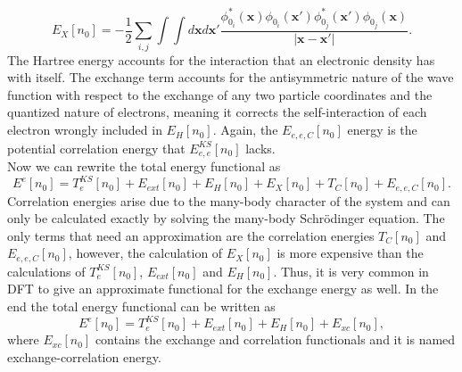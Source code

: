 \begin{equation}
 E_{X}[n_{0}]=-\frac{1}{2}\sum_{i,j}\int{\int{d\mathbf{x}d\mathbf{x}'\frac{\phi_{0_{i}}^{*}(\mathbf{x})\phi_{0_{i}}(\mathbf{x}')\phi_{0_{j}}^{*}(\mathbf{x}')\phi_{0_{j}}(\mathbf{
 x})}{|\mathbf{x}-\mathbf{x}'|}}}.
\end{equation}
The Hartree energy accounts for the interaction that an electronic density has with itself. The exchange term accounts for the antisymmetric nature of the wave function with respect to the exchange of any two particle coordinates 
and the quantized nature of electrons, meaning it corrects the self-interaction of each electron wrongly included in $E_{H}[n_{0}]$. Again, the $E_{e,e,C}[n_{0}]$ energy is the potential correlation energy 
that $E_{e,e}^{KS}[n_{0}]$ lacks. \\

Now we can rewrite the total energy functional as
\begin{equation}
 E^{e}[n_{0}]=T_{e}^{KS}[n_{0}]+E_{ext}[n_{0}]+E_{H}[n_{0}]+E_{X}[n_{0}]+T_{C}[n_{0}]+E_{e,e,C}[n_{0}].
\end{equation}
Correlation energies arise due to the many-body character of the system and can only be calculated exactly by solving the many-body Schr\"odinger equation\cite{ceperley1980ground}. The only terms that need an approximation are the 
correlation energies $T_{C}[n_{0}]$ and \\ $E_{e,e,C}[n_{0}]$, however, the calculation of $E_{X}[n_{0}]$ is more expensive than the calculations of $T_{e}^{KS}[n_{0}]$, $E_{ext}[n_{0}]$ and $E_{H}[n_{0}]$. Thus, it 
is very common in DFT to give an approximate functional for the exchange energy as well. In the end the total energy functional can be written as
\begin{equation}
 E^{e}[n_{0}]=T_{e}^{KS}[n_{0}]+E_{ext}[n_{0}]+E_{H}[n_{0}]+E_{xc}[n_{0}],
\end{equation}
where $E_{xc}[n_{0}]$ contains the exchange and correlation functionals and it is named exchange-correlation energy. \\

